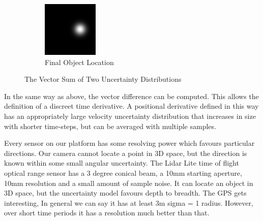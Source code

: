 \documentclass[a4paper, 11pt, titlepage]{article}
\begin{document}
\begin{figure}
      \begin{subfigure}{.3\textwidth}
        \centering
        \includegraphics[width=.8\linewidth]{images/GaussianSum3.png}
        \caption{Final Object Location}
        \label{fig:vectSumsub3}
      \end{subfigure}
      \caption{The Vector Sum of Two Uncertainty Distributions}
      \label{fig:vectSum}
      \end{figure}
      In the same way as above, the vector difference can be computed.  This allows the definition of a discreet time derivative.  A positional derivative defined in this way has an appropriately large velocity uncertainty distribution that increases in size with shorter time-steps, but can be averaged with multiple samples.
      
      Every sensor on our platform has some resolving power which favours particular directions.
      Our camera cannot locate a point in 3D space, but the direction is known within some small angular uncertainty.
      The Lidar Lite time of flight optical range sensor has a 3 degree conical beam, a 10mm starting aperture, 10mm resolution and a small amount of sample noise. It can locate an object in 3D space, but the uncertainty model favours depth to breadth.
      The GPS gets interesting, In general we can say it has at least 3m sigma = 1 radius. However, over short time periods it has a resolution much better than that.
\end{document}
